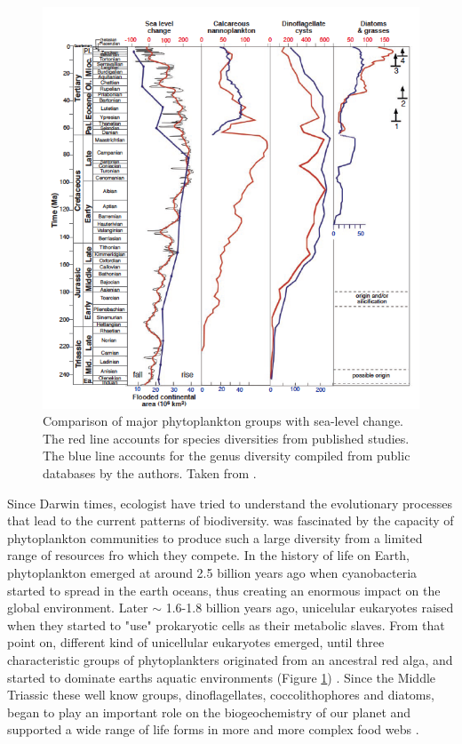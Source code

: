 \begin{figure}
\centering
\includegraphics[trim = 0mm 0mm 0mm 0mm, clip, width=1\linewidth]{./Chp3-Further/Falkowski-2004.png}
\caption[Scheme]{\small {Comparison of major phytoplankton groups with sea-level change. The red line accounts for species diversities from published studies. The blue line accounts for the genus diversity compiled from public databases by the authors. Taken from \citet{Falkowski2004a}. }}
\label{Falkowski}
\end{figure}

Since Darwin times, ecologist have tried to understand the evolutionary processes that lead to the current patterns of biodiversity. \citet{Hutchinson1961} was fascinated by the capacity of phytoplankton communities to produce such  a large diversity from a limited range of resources fro which they compete. In the history of life on Earth, phytoplankton emerged at around 2.5 billion years ago when cyanobacteria started to spread in the earth oceans, thus creating an enormous impact on the global environment. Later $\sim$ 1.6-1.8 billion years ago, unicelular eukaryotes raised when they started to "use" prokaryotic cells as their metabolic slaves. From that point on, different kind of unicellular eukaryotes emerged, until three characteristic groups of phytoplankters originated from an ancestral red alga, and started to dominate earths aquatic environments (Figure \ref{Falkowski}) \citep{Falkowski2004a}. Since the Middle Triassic these well know groups, dinoflagellates, coccolithophores and diatoms, began to play an important role on the biogeochemistry of our planet and supported a wide range of life forms in more and more complex food webs \citep{Falkowski1998}.

